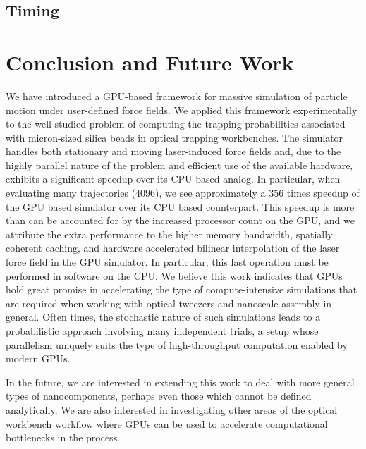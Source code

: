 \documentclass[twocolumn,10pt]{asme2ej}
\begin{document}
\subsection{Timing}


\section{Conclusion and Future Work}

We have introduced a GPU-based framework for massive simulation of particle
motion under user-defined force fields.  We applied this framework
experimentally to the well-studied problem of computing the trapping
probabilities associated with micron-sized silica beads in optical
trapping workbenches.  The simulator handles both stationary and
moving laser-induced force fields and, due to the highly parallel nature of the problem
and efficient use of the available hardware, exhibits a significant
speedup over its CPU-based analog. In particular, when evaluating many
trajectories ($4096$), we see approximately a $356$ times speedup of
the GPU based simulator over its CPU based counterpart.  This speedup
is more than can be accounted for by the increased processor count on
the GPU, and we attribute the extra performance to the higher memory
bandwidth, spatially coherent caching, and hardware accelerated
bilinear interpolation of the laser force field in the GPU simulator.
In particular, this last operation must be performed in software on
the CPU.  We believe this work indicates that GPUs hold great promise
in accelerating the type of compute-intensive simulations that are
required when working with optical tweezers and nanoscale assembly in
general.  Often times, the stochastic nature of such simulations leads
to a probabilistic approach involving many independent trials, a setup
whose parallelism uniquely suits the type of high-throughput
computation enabled by modern GPUs.

In the future, we are interested in extending this work to deal with
more general types of nanocomponents, perhaps even those which cannot
be defined analytically.  We are also interested in investigating
other areas of the optical workbench workflow where GPUs can be used
to accelerate computational bottlenecks in the process.



\end{document}
